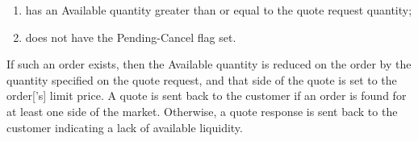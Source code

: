 \documentclass[12pt,a4paper,notitlepage,bibliography=totoc]{scrreprt}
\begin{document}
\begin{enumerate}
  \item has an Available quantity greater than or equal to the \gls{quote} request quantity;
  \item does not have the Pending-Cancel flag set.
\end{enumerate}

If such an \gls{order} exists, then the Available quantity is reduced on the \gls{order} by the
quantity specified on the \gls{quote} request, and that side of the \gls{quote} is set to the
\gls{order}['s] \gls{limit price}. A \gls{quote} is sent back to the customer if an \gls{order} is
found for at least one side of the \gls{market}. Otherwise, a \gls{quote} response is sent back to
the customer indicating a lack of available \gls{liquidity}.
\end{document}
